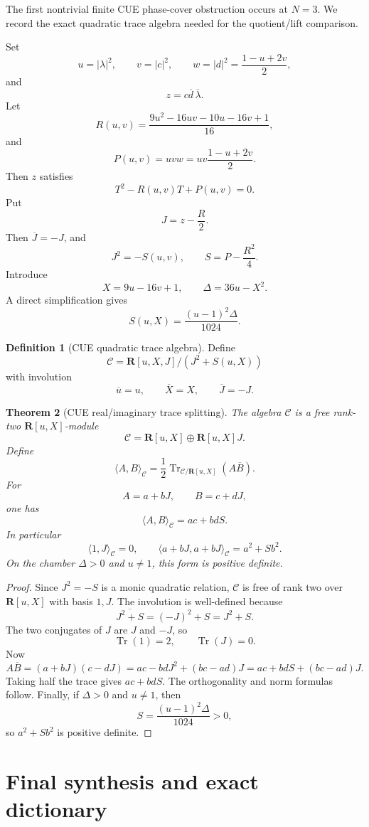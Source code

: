 \documentclass[11pt]{article}
\newcommand{\R}{\mathbf R}
\newcommand{\Tr}{\operatorname{Tr}}
\theoremstyle{plain}
\newtheorem{theorem}{Theorem}[section]
\theoremstyle{definition}
\newtheorem{definition}[theorem]{Definition}
\begin{document}
The first nontrivial finite CUE phase-cover obstruction occurs at \(N=3\).  We record the exact quadratic trace algebra needed for the quotient/lift comparison.

Set
\[
   u=|\lambda|^2,
   \qquad
   v=|c|^2,
   \qquad
   w=|d|^2=\frac{1-u+2v}{2},
\]
and
\[
   z=c\overline d\,\overline\lambda.
\]
Let
\[
   R(u,v)=\frac{9u^2-16uv-10u-16v+1}{16},
\]
and
\[
   P(u,v)=uvw=uv\frac{1-u+2v}{2}.
\]
Then \(z\) satisfies
\[
   T^2-R(u,v)T+P(u,v)=0.
\]
Put
\[
   J=z-\frac R2.
\]
Then \(\overline J=-J\), and
\[
   J^2=-S(u,v),
   \qquad
   S=P-\frac{R^2}{4}.
\]
Introduce
\[
   X=9u-16v+1,
   \qquad
   \Delta=36u-X^2.
\]
A direct simplification gives
\[
   S(u,X)=\frac{(u-1)^2\Delta}{1024}.
\]

\begin{definition}[CUE quadratic trace algebra]\label{def:CUE-trace-algebra}
Define
\[
   \mathcal C=\R[u,X,J]/(J^2+S(u,X))
\]
with involution
\[
   \overline u=u,
   \qquad
   \overline X=X,
   \qquad
   \overline J=-J.
\]
\end{definition}

\begin{theorem}[CUE real/imaginary trace splitting]\label{thm:CUE-trace}
The algebra \(\mathcal C\) is a free rank-two \(\R[u,X]\)-module
\[
   \mathcal C=\R[u,X]\oplus\R[u,X]J.
\]
Define
\[
   \langle A,B\rangle_{\mathcal C}=\frac12\Tr_{\mathcal C/\R[u,X]}(A\overline B).
\]
For
\[
   A=a+bJ,
   \qquad
   B=c+dJ,
\]
one has
\[
   \langle A,B\rangle_{\mathcal C}=ac+bdS.
\]
In particular
\[
   \langle 1,J\rangle_{\mathcal C}=0,
   \qquad
   \langle a+bJ,a+bJ\rangle_{\mathcal C}=a^2+Sb^2.
\]
On the chamber \(\Delta>0\) and \(u\ne1\), this form is positive definite.
\end{theorem}

\begin{proof}
Since \(J^2=-S\) is a monic quadratic relation, \(\mathcal C\) is free of rank two over \(\R[u,X]\) with basis \(1,J\).  The involution is well-defined because
\[
   \overline{J^2+S}=(-J)^2+S=J^2+S.
\]
The two conjugates of \(J\) are \(J\) and \(-J\), so
\[
   \Tr(1)=2,
   \qquad
   \Tr(J)=0.
\]
Now
\[
   A\overline B=(a+bJ)(c-dJ)=ac-bdJ^2+(bc-ad)J=ac+bdS+(bc-ad)J.
\]
Taking half the trace gives \(ac+bdS\).  The orthogonality and norm formulas follow.  Finally, if \(\Delta>0\) and \(u\ne1\), then
\[
   S=\frac{(u-1)^2\Delta}{1024}>0,
\]
so \(a^2+Sb^2\) is positive definite.
\end{proof}

\section{Final synthesis and exact dictionary}
\end{document}

